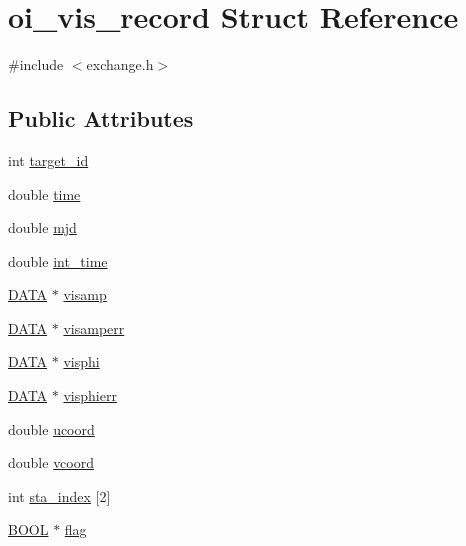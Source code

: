 \hypertarget{structoi__vis__record}{
\section{oi\_\-vis\_\-record Struct Reference}
\label{structoi__vis__record}
}


{\ttfamily \#include $<$exchange.h$>$}

\subsection*{Public Attributes}
\begin{DoxyCompactItemize}
\item 
int \hyperlink{structoi__vis__record_a6ca9aa550c1df9c5166262e4a55110d1}{target\_\-id}
\item 
double \hyperlink{structoi__vis__record_a0d47200b6555926f9145360e5aeb2b1f}{time}
\item 
double \hyperlink{structoi__vis__record_abd5ba1716f2f44e792cd05a0b6cdf42c}{mjd}
\item 
double \hyperlink{structoi__vis__record_aaa8814c38efe3c128a0bd6dc19783c2e}{int\_\-time}
\item 
\hyperlink{group__oitable_gaad99e8bad1a589e9f406f33403d42ca7}{DATA} $\ast$ \hyperlink{structoi__vis__record_a2f3ddb296968ff027355685dac5b190f}{visamp}
\item 
\hyperlink{group__oitable_gaad99e8bad1a589e9f406f33403d42ca7}{DATA} $\ast$ \hyperlink{structoi__vis__record_a81c1ae4af3bdbb9c3733966b6cbc0d1f}{visamperr}
\item 
\hyperlink{group__oitable_gaad99e8bad1a589e9f406f33403d42ca7}{DATA} $\ast$ \hyperlink{structoi__vis__record_ad41751320cdb31c9f491da4897378079}{visphi}
\item 
\hyperlink{group__oitable_gaad99e8bad1a589e9f406f33403d42ca7}{DATA} $\ast$ \hyperlink{structoi__vis__record_a5a8b83e5f4f8af4ff64a58c460552820}{visphierr}
\item 
double \hyperlink{structoi__vis__record_a9596a5b78c3a8d06ce8377479fc18f5a}{ucoord}
\item 
double \hyperlink{structoi__vis__record_a366af261ccf051d13ca3cda1c672380b}{vcoord}
\item 
int \hyperlink{structoi__vis__record_ab76303f2bb5b81d4dbb771616de2f531}{sta\_\-index} \mbox{[}2\mbox{]}
\item 
\hyperlink{group__oitable_gaf492d2bddcb2befacb3aa03dcdf9aafd}{BOOL} $\ast$ \hyperlink{structoi__vis__record_aaf94f160dc061690b41a0d2c6083d9d7}{flag}
\end{DoxyCompactItemize}


